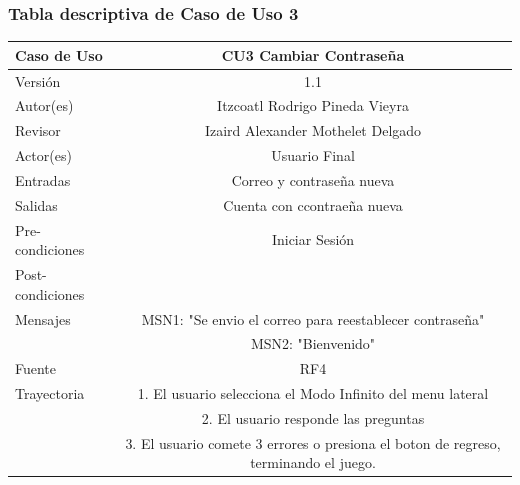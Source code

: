 \documentclass{article}
\begin{document}
\subsubsection{Tabla descriptiva de Caso de Uso 3}
\begin{tabular}{|M{5cm}|c|}
\hline
Caso de Uso & CU3 Cambiar Contraseña\\ \hline
Versión & 1.1\\ \hline
Autor(es) & Itzcoatl Rodrigo Pineda Vieyra\\ \hline
Revisor & Izaird Alexander Mothelet Delgado \\ \hline
Actor(es) & Usuario Final \\ \hline
Entradas &  Correo y contraseña nueva \\ \hline
Salidas & Cuenta con ccontraeña nueva \\ \hline
Pre-condiciones & Iniciar Sesión \\ \hline
Post-condiciones & \\ \hline
Mensajes & MSN1: "Se envio el correo para reestablecer contraseña"\\
		   & MSN2: "Bienvenido"\\ \hline
Fuente & RF4 \\ \hline	
	Trayectoria
		& 1.	El usuario selecciona el Modo Infinito del menu lateral\\
		& 2.    El usuario responde  las preguntas \\
		& 3.	El usuario comete 3 errores o presiona el boton de regreso, terminando el juego.\\ \hline
\end{tabular}
\end{document}
